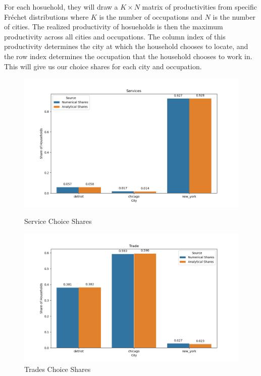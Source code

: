 \documentclass[10pt]{article}
\begin{document}
For each hosuehold, they will draw a $K \times N$ matrix of productivities from specific Fr\'{e}chet distributions where $K$ is the number of occupations and $N$ is the number of cities. The realized productivity of hosueholds is then the maximum productivity across all cities and occupations. The column index of this productivity determines the city at which the household chooses to locate, and the row index determines the occupation that the household chooses to work in. This will give us our choice shares for each city and occupation.

\begin{figure}[!htb]
    \begin{minipage}{0.5\textwidth}
        \centering
        \includegraphics[width=\textwidth]{../../simulations/graphs/sim_services.png}
        \caption{Service Choice Shares}
        \label{sim_services}
    \end{minipage}
    \begin{minipage}{0.5\textwidth}
        \centering
        \includegraphics[width=\textwidth]{../../simulations/graphs/sim_trade.png}
        \caption{Trades Choice Shares}
        \label{sim_trades}
    \end{minipage}
\end{figure}
\end{document}
